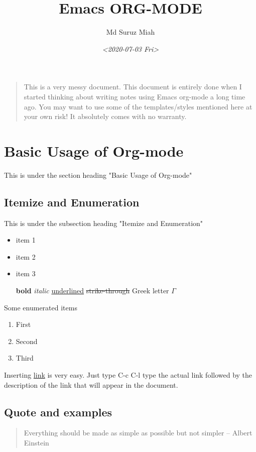 \documentclass[11pt]{article}
\author{Md Suruz Miah}
\date{\textit{<2020-07-03 Fri>}}
\title{Emacs ORG-MODE}
\begin{document}
\maketitle
\tableofcontents

\begin{quote}
This is a very messy document. This document is entirely done when I started thinking about writing notes using Emacs org-mode a long time ago. You may want to use some of the templates/styles mentioned here at your own risk! It absolutely comes with no warranty. 
\end{quote}



\section{Basic Usage of Org-mode}
\label{sec:orga73fd54}

This is under the section heading "Basic Usage of Org-mode"

\subsection{Itemize and Enumeration}
\label{sec:org4acb3ba}

This is under the subsection heading "Itemize and Enumeration"
\begin{itemize}
\item item 1
\item item 2
\item item 3

\textbf{bold} \emph{italic} \uline{underlined} \sout{strike-through} Greek letter \(\Gamma\)
\end{itemize}
Some enumerated  items 
\begin{enumerate}
\item First
\item Second
\item Third
\end{enumerate}

Inserting \href{http://www.personalpages.bradley.edu/\~smiah}{link} is very easy. Just type C-c C-l type the actual link followed by the description of the link that will appear in the document. 
\subsection{Quote and examples}
\label{sec:org16efc4e}

\begin{quote}
Everything should be made as simple as possible but not simpler -- Albert Einstein
\end{quote}
\end{document}

